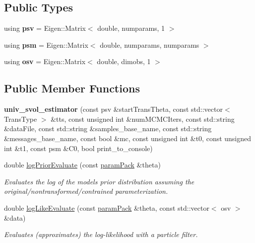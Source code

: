 \subsection*{Public Types}
\begin{DoxyCompactItemize}
\item 
\mbox{\label{classuniv__svol__estimator_a8a2885f5c1f04d599de5c10c732f678e}} 
using {\bfseries psv} = Eigen\+::\+Matrix$<$ double, numparams, 1 $>$
\item 
\mbox{\label{classuniv__svol__estimator_ae375e08936c3b348e7f43d25ce5b2673}} 
using {\bfseries psm} = Eigen\+::\+Matrix$<$ double, numparams, numparams $>$
\item 
\mbox{\label{classuniv__svol__estimator_ac1b364d74291b50f7e874cec66670e97}} 
using {\bfseries osv} = Eigen\+::\+Matrix$<$ double, dimobs, 1 $>$
\end{DoxyCompactItemize}
\subsection*{Public Member Functions}
\begin{DoxyCompactItemize}
\item 
\mbox{\label{classuniv__svol__estimator_ad635fb185be86037131bdf394fb46afa}} 
{\bfseries univ\+\_\+svol\+\_\+estimator} (const psv \&start\+Trans\+Theta, const std\+::vector$<$ Trans\+Type $>$ \&tts, const unsigned int \&num\+M\+C\+M\+C\+Iters, const std\+::string \&data\+File, const std\+::string \&samples\+\_\+base\+\_\+name, const std\+::string \&messages\+\_\+base\+\_\+name, const bool \&mc, const unsigned int \&t0, const unsigned int \&t1, const psm \&C0, bool print\+\_\+to\+\_\+console)
\item 
double \hyperlink{classuniv__svol__estimator_a6ee82e972206fa6ba1c8b4e359a7f6b7}{log\+Prior\+Evaluate} (const \hyperlink{classparamPack}{param\+Pack} \&theta)
\begin{DoxyCompactList}\small\item\em Evaluates the log of the model\textquotesingle{}s prior distribution assuming the original/nontransformed/contrained parameterization. \end{DoxyCompactList}\item 
double \hyperlink{classuniv__svol__estimator_aa73d0f9b96955c0b57fe59052e280008}{log\+Like\+Evaluate} (const \hyperlink{classparamPack}{param\+Pack} \&theta, const std\+::vector$<$ osv $>$ \&data)
\begin{DoxyCompactList}\small\item\em Evaluates (approximates) the log-\/likelihood with a particle filter. \end{DoxyCompactList}\end{DoxyCompactItemize}


